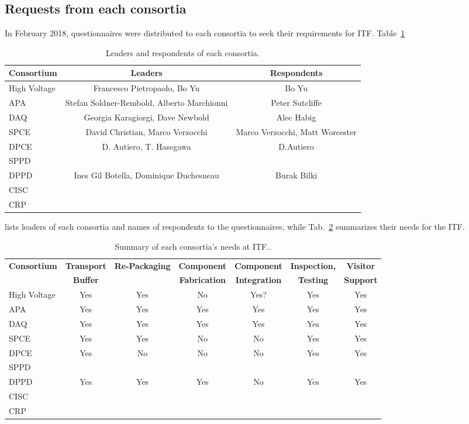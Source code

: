 \subsection{\bf Requests from each consortia} 
In February 2018, questionnaires were distributed to each consortia to seek
their requirements for ITF. Table~\ref{table:leders} 
\begin{table}[htbp]
\caption{Leaders and respondents of each consortia.}
\label{table:leders}
\begin{center}
\begin{tabular}{|l|c|c|} \hline
{\bf Consortium} & {\bf Leaders} &{\bf Respondents} \\\hline
High Voltage & Francesco Pietropaolo, Bo Yu & Bo Yu \\ \hline
APA & Stefan Soldner-Rembold, Alberto Marchionni & Peter Sutcliffe \\ \hline
DAQ & Georgia Karagiorgi, Dave Newbold & Alec Habig \\ \hline
SPCE & David Christian, Marco Verzocchi  & Marco Verzocchi, Matt Worcester\\ \hline
DPCE & D. Autiero, T. Hasegawa &  D.Autiero  \\ \hline
SPPD & & \\ \hline
DPPD & Ines Gil Botella, Dominique Duchesneau & Burak Bilki \\ \hline
CISC & &   \\ \hline
CRP & &  \\   \hline
\end{tabular}
\end{center}
\end{table}
lists leaders of each consortia and names of respondents to the
questionnaires, while Tab.~\ref{table:responses} summarizes their
needs for the ITF.
\begin{table}[htbp]
\caption{Summary of each consortia's needs at ITF..}
\label{table:responses}
\begin{center}
\scalebox{0.95}
{
\begin{tabular}{|l|c|c|c|c|c|c| } 
\hline
{\bf Consortium} & {\bf Transport} &{\bf Re-Packaging}&{\bf Component}
&{\bf Component}&{\bf Inspection,}&{\bf Visitor} \\
 & {\bf Buffer} &{\bf }&{\bf Fabrication}
&{\bf Integration}&{\bf Testing}&{\bf Support} \\ \hline 
High Voltage & Yes & Yes & No & Yes? & Yes & Yes \\ \hline
APA & Yes & Yes & Yes & Yes & Yes & Yes \\ \hline
DAQ & Yes & Yes & Yes & Yes & Yes & Yes \\ \hline
SPCE & Yes & Yes & No & No & Yes & Yes \\ \hline
DPCE & Yes & No & No & No & Yes & Yes \\ \hline
SPPD & & & & & &  \\ \hline
DPPD & Yes & Yes & Yes & No & Yes & Yes \\ \hline
CISC & & & & & &  \\ \hline
CRP & & & & & &  \\   \hline
\end{tabular}
}
\end{center}
\end{table}
